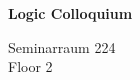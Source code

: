 \documentclass[a4paper]{article}
\begin{document}
\printGenericVSLHeader
\begin{center}
\begin{vsltext}{3cm}{4cm}

   \vspace{0.5cm} 

    \textbf{Logic Colloquium} 

    \vspace{1.5cm}

    Seminarraum 224 \\
    Floor 2

\end{vsltext}

\end{center}
\end{document}
